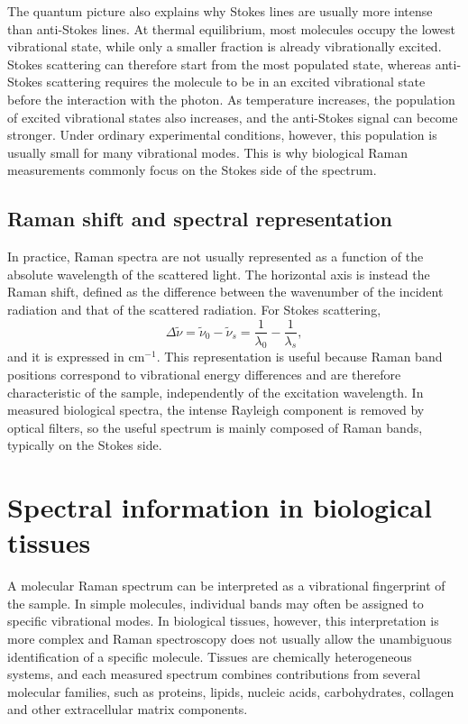 The quantum picture also explains why Stokes lines are usually more intense than anti-Stokes lines. At thermal equilibrium, most molecules occupy the lowest vibrational state, while only a smaller fraction is already vibrationally excited. Stokes scattering can therefore start from the most populated state, whereas anti-Stokes scattering requires the molecule to be in an excited vibrational state before the interaction with the photon. As temperature increases, the population of excited vibrational states also increases, and the anti-Stokes signal can become stronger. Under ordinary experimental conditions, however, this population is usually small for many vibrational modes. This is why biological Raman measurements commonly focus on the Stokes side of the spectrum.

\subsection{Raman shift and spectral representation}
\label{subsec:raman_shifts}

In practice, Raman spectra are not usually represented as a function of the absolute wavelength of the scattered light. The horizontal axis is instead the Raman shift, defined as the difference between the wavenumber of the incident radiation and that of the scattered radiation. For Stokes scattering,
\begin{equation}
    \Delta \tilde{\nu} =
    \tilde{\nu}_0 - \tilde{\nu}_s =
    \frac{1}{\lambda_0} - \frac{1}{\lambda_s},
    \label{eq:raman_shift}
\end{equation}
and it is expressed in \(\mathrm{cm}^{-1}\). This representation is useful because Raman band positions correspond to vibrational energy differences and are therefore characteristic of the sample, independently of the excitation wavelength. In measured biological spectra, the intense Rayleigh component is removed by optical filters, so the useful spectrum is mainly composed of Raman bands, typically on the Stokes side.

\section{Spectral information in biological tissues} 
\label{sec:raman_biological_tissues}

A molecular Raman spectrum can be interpreted as a vibrational fingerprint of the sample. In simple molecules, individual bands may often be assigned to specific vibrational modes. In biological tissues, however, this interpretation is more complex and Raman spectroscopy does not usually allow the unambiguous identification of a specific molecule. Tissues are chemically heterogeneous systems, and each measured spectrum combines contributions from several molecular families, such as proteins, lipids, nucleic acids, carbohydrates, collagen and other extracellular matrix components. 

